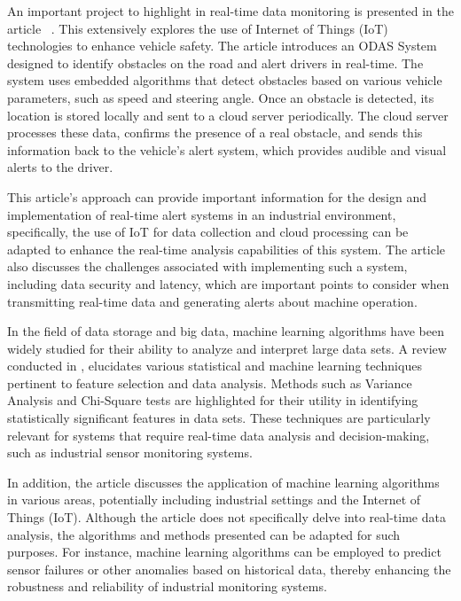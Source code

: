 An important project to highlight in real-time data monitoring is presented in the article ~\cite{Umakirthika2018}. This extensively explores the use of Internet of Things (IoT) technologies to enhance vehicle safety. The article introduces an \gls{ODAS} System designed to identify obstacles on the road and alert drivers in real-time. The system uses embedded algorithms that detect obstacles based on various vehicle parameters, such as speed and steering angle. Once an obstacle is detected, its location is stored locally and sent to a cloud server periodically. The cloud server processes these data, confirms the presence of a real obstacle, and sends this information back to the vehicle's alert system, which provides audible and visual alerts to the driver.

This article's approach can provide important information for the design and implementation of real-time alert systems in an industrial environment, specifically, the use of IoT for data collection and cloud processing can be adapted to enhance the real-time analysis capabilities of this system. The article also discusses the challenges associated with implementing such a system, including data security and latency, which are important points to consider when transmitting real-time data and generating alerts about machine operation.

In the field of data storage and big data, machine learning algorithms have been widely studied for their ability to analyze and interpret large data sets. A review conducted in \cite{sarker2021machine}, elucidates various statistical and machine learning techniques pertinent to feature selection and data analysis. Methods such as Variance Analysis and Chi-Square tests are highlighted for their utility in identifying statistically significant features in data sets. These techniques are particularly relevant for systems that require real-time data analysis and decision-making, such as industrial sensor monitoring systems.

In addition, the article discusses the application of machine learning algorithms in various areas, potentially including industrial settings and the Internet of Things (IoT). Although the article does not specifically delve into real-time data analysis, the algorithms and methods presented can be adapted for such purposes. For instance, machine learning algorithms can be employed to predict sensor failures or other anomalies based on historical data, thereby enhancing the robustness and reliability of industrial monitoring systems.

